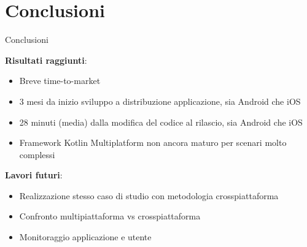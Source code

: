 
\section{Conclusioni}

\begin{frame}{Conclusioni}

    \textbf{Risultati raggiunti}:
    \begin{itemize}
        \item Breve time-to-market
        \item 3 mesi da inizio sviluppo a distribuzione applicazione, sia Android che iOS
        \item 28 minuti (media) dalla modifica del codice al rilascio, sia Android che iOS
        \item Framework Kotlin Multiplatform non ancora maturo per scenari molto complessi
    \end{itemize}

    \vspace{3mm}

    \textbf{Lavori futuri}:
    \begin{itemize}
        \item Realizzazione stesso caso di studio con metodologia crosspiattaforma
        \item Confronto multipiattaforma vs crosspiattaforma
        \item Monitoraggio applicazione e utente
    \end{itemize}
    
\end{frame}
